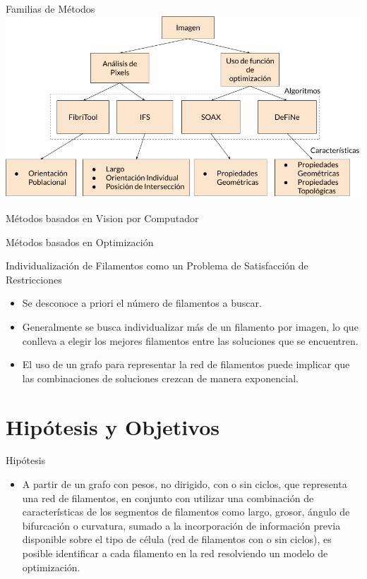 \documentclass[]{beamer}
\begin{document}
\begin{frame}{Familias de M\'etodos}
    \centering
    \includegraphics[width=\textwidth]{Pictures/familiasDeMetodos.png}
\end{frame}

\begin{frame}{M\'etodos basados en Vision por Computador}
    
\end{frame}

\begin{frame}{M\'etodos basados en Optimizaci\'on}
    
\end{frame}

\begin{frame}{Individualizaci\'on de Filamentos como un Problema de Satisfacci\'on de Restricciones}
    \begin{itemize}
    \item Se desconoce a priori el n\'umero de filamentos a buscar.%
    \item Generalmente se busca individualizar m\'as de un filamento por imagen, lo que conlleva a elegir los mejores filamentos entre las soluciones que se encuentren.
    \item El uso de un grafo para representar la red de filamentos puede implicar que las combinaciones de soluciones crezcan de manera exponencial.
\end{itemize}
\end{frame}

\section{Hip\'otesis y Objetivos}
\begin{frame}{Hip\'otesis}
\small
    \begin{itemize}
        \item A partir de un grafo con pesos, no dirigido, con o sin ciclos, que representa una red de filamentos, en conjunto con utilizar una combinaci\'on de caracter\'isticas de los segmentos de filamentos como largo, grosor, \'angulo de bifurcaci\'on o curvatura, sumado a la incorporaci\'on de informaci\'on previa disponible sobre el tipo de c\'elula (red de filamentos con o sin ciclos), es posible identificar a cada filamento en la red resolviendo un modelo de optimizaci\'on.
    \end{itemize}
\end{frame}
\end{document}
